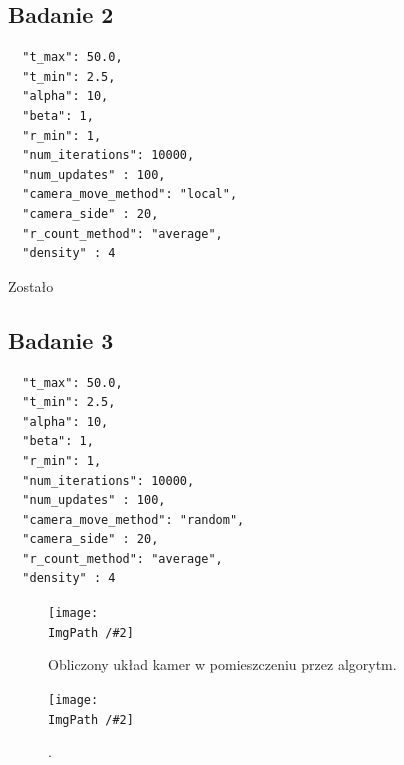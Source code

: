 \documentclass[12pt,a4paper]{article}
\newcommand{\ImgPath}{./img/}
\newcommand\Figure[4][width=\linewidth]{%
  \begin{figure} [h!]
    \centering
    \texttt{[image: \\ImgPath /\#2]}
    \caption{#3}\label{#4}
  \end{figure}
}
\begin{document}
\subsection{Badanie 2}
\begin{lstlisting}
  "t_max": 50.0,
  "t_min": 2.5,
  "alpha": 10,
  "beta": 1,
  "r_min": 1,
  "num_iterations": 10000,
  "num_updates" : 100,
  "camera_move_method": "local",
  "camera_side" : 20,
  "r_count_method": "average",
  "density" : 4
\end{lstlisting}
Zostało 

\subsection{Badanie 3}

\begin{lstlisting}
  "t_max": 50.0,
  "t_min": 2.5,
  "alpha": 10,
  "beta": 1,
  "r_min": 1,
  "num_iterations": 10000,
  "num_updates" : 100,
  "camera_move_method": "random",
  "camera_side" : 20,
  "r_count_method": "average",
  "density" : 4
\end{lstlisting}
\Figure[scale=0.4]{3/best_state.png}{Obliczony układ kamer w pomieszczeniu przez algorytm.}{label}
\Figure[scale=0.4]{3/average_costs.png}{.}{label}
\end{document}
